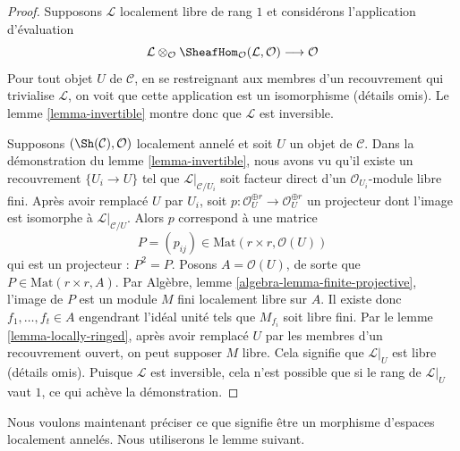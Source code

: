 \begin{proof}
Supposons $\mathcal{L}$ localement libre de rang $1$ et considérons
l'application d'évaluation
$$
\mathcal{L} \otimes_\mathcal{O}
\SheafHom_\mathcal{O}(\mathcal{L}, \mathcal{O})
\longrightarrow \mathcal{O}
$$
Pour tout objet $U$ de $\mathcal{C}$, en se restreignant aux membres d'un
recouvrement qui trivialise $\mathcal{L}$, on voit que cette application est
un isomorphisme (détails omis). Le lemme \ref{lemma-invertible} montre donc que
$\mathcal{L}$ est inversible.

\medskip\noindent
Supposons $(\Sh(\mathcal{C}), \mathcal{O})$ localement annelé et soit $U$ un
objet de $\mathcal{C}$. Dans la démonstration du lemme \ref{lemma-invertible},
nous avons vu qu'il existe un recouvrement $\{U_i \to U\}$ tel que
$\mathcal{L}|_{\mathcal{C}/U_i}$ soit facteur direct d'un
$\mathcal{O}_{U_i}$-module libre fini. Après avoir remplacé $U$ par $U_i$,
soit
$p : \mathcal{O}_U^{\oplus r} \to \mathcal{O}_U^{\oplus r}$
un projecteur dont l'image est isomorphe à $\mathcal{L}|_{\mathcal{C}/U}$.
Alors $p$ correspond à une matrice
$$
P = (p_{ij}) \in \text{Mat}(r \times r, \mathcal{O}(U))
$$
qui est un projecteur : $P^2 = P$. Posons $A = \mathcal{O}(U)$, de sorte que
$P \in \text{Mat}(r \times r, A)$. Par Algèbre,
lemme \ref{algebra-lemma-finite-projective}, l'image de $P$ est un module
$M$ fini localement libre sur $A$. Il existe donc
$f_1, \ldots, f_t \in A$ engendrant l'idéal unité tels que $M_{f_i}$ soit libre
fini. Par le lemme \ref{lemma-locally-ringed}, après avoir remplacé $U$ par les
membres d'un recouvrement ouvert, on peut supposer $M$ libre. Cela signifie
que $\mathcal{L}|_U$ est libre (détails omis). Puisque $\mathcal{L}$ est
inversible, cela n'est possible que si le rang de $\mathcal{L}|_U$ vaut $1$,
ce qui achève la démonstration.
\end{proof}

\noindent
Nous voulons maintenant préciser ce que signifie être un morphisme d'espaces
localement annelés. Nous utiliserons le lemme suivant.


